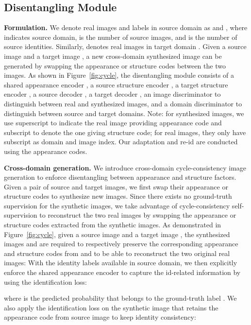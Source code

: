 \documentclass[runningheads]{llncs}
\begin{document}
\subsection{Disentangling Module}

\textbf{Formulation.} 
We denote real images and labels in source domain as  and , where  indicates source domain,  is the number of source images,  and  is the number of source identities. Similarly,  denotes  real images in target domain . Given a source image  and a target image , a new cross-domain synthesized image can be generated by swapping the appearance or structure codes between the two images. As shown in Figure~\ref{fig:cycle}, the disentangling module consists of a shared appearance encoder , a source structure encoder , a target structure encoder , a source decoder , a target decoder , an image discriminator  to distinguish between real and synthesized images, and a domain discriminator  to distinguish between source and target domains. Note: for synthesized images, we use superscript to indicate the real image providing appearance code and subscript to denote the one giving structure code; for real images, they only have subscript as domain and image index. 
Our adaptation and re-id are conducted using the appearance codes. 


\noindent\textbf{Cross-domain generation.} We introduce cross-domain cycle-consistency image generation to enforce disentangling between appearance and structure factors. Given a pair of source and target images, we first swap their appearance or structure codes to  synthesize new images. Since there exists no ground-truth supervision for the synthetic images, we take advantage of cycle-consistency self-supervision to reconstruct the two real images by swapping the appearance or structure codes extracted from the synthetic images. As demonstrated in Figure~\ref{fig:cycle}, given a source image  and a target image , the synthesized images  and  are required to respectively preserve the corresponding appearance and structure codes from  and  to be able to reconstruct the two original real images: 
\noindent With the identity labels available in source domain, we then explicitly enforce the shared appearance encoder to capture the id-related information by using the identification loss:

\noindent where  is the predicted probability that  belongs to the ground-truth label . We also apply the identification loss on the synthetic image that retains the appearance code from source image to keep identity consistency: 
\end{document}
